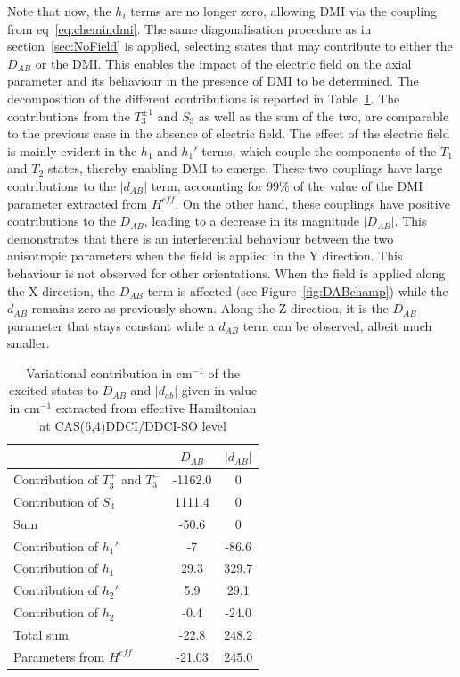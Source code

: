 \documentclass[12pt,a4paper]{report}
\numberwithin{equation}{section}
\begin{document}
Note that now, the $h_i$ terms are no longer zero, allowing DMI via the coupling from eq~\ref{eq:chemindmi}.
The same diagonalisation procedure as in section~\ref{sec:NoField} is applied, selecting states that may contribute to either the $D_{AB}$ or the DMI.
This enables the impact of the electric field on the axial parameter and its behaviour in the presence of DMI to be determined.
The decomposition of the different contributions is reported in Table~\ref{tab:decompfield}.
The contributions from the $T_3^{\pm1}$ and $S_3$ as well as the sum of the two, are comparable to the previous case in the absence of electric field.
The effect of the electric field is mainly evident in the $h_1$ and $h_1'$ terms, which couple the components of the $T_1$ and $T_2$ states, thereby enabling DMI to emerge.
These two couplings have large contributions to the $|d_{AB}|$ term, accounting for 99\% of the value of the DMI parameter extracted from $H^{eff}$.
On the other hand, these couplings have positive contributions to the $D_{AB}$, leading to a decrease in its magnitude $|D_{AB}|$.
This demonstrates that there is an interferential behaviour between the two anisotropic parameters when the field is applied in the Y direction.
This behaviour is not observed for other orientations. 
When the field is applied along the X direction, the $D_{AB}$ term is affected (see Figure~\ref{fig:DABchamp}) while the $d_{AB}$ remains zero as previously shown.
Along the Z direction, it is the $D_{AB}$ parameter that stays constant while a $d_{AB}$ term can be observed, albeit much smaller.

\begin{table}
    \centering
    \begin{tabular}{l c c}
        \hline
        \hline
         & $D_{AB}$ & $|d_{AB}|$\\
         \hline
         Contribution of $T_3^+$ and $T_3^-$& -1162.0& 0 \\
         Contribution of $S_3$& 1111.4 & 0\\
         Sum & -50.6 &0\\
         Contribution of $h_1'$ & -7 & -86.6\\
         Contribution of $h_1$& 29.3 & 329.7\\
         Contribution of $h_2'$& 5.9 & 29.1\\
         Contribution of $h_2$ & -0.4 & -24.0\\
         Total sum & -22.8  & 248.2\\
         Parameters from $H^{eff}$ & -21.03 & 245.0\\
         \hline
         \hline
    \end{tabular}
    \caption{Variational contribution in cm$^{-1}$ of the excited states to $D_{AB}$ and $|d_{ab}|$ given in value in cm$^{-1}$ extracted from effective Hamiltonian at CAS(6,4)DDCI/DDCI-SO level}
    \label{tab:decompfield}
\end{table}
\end{document}
